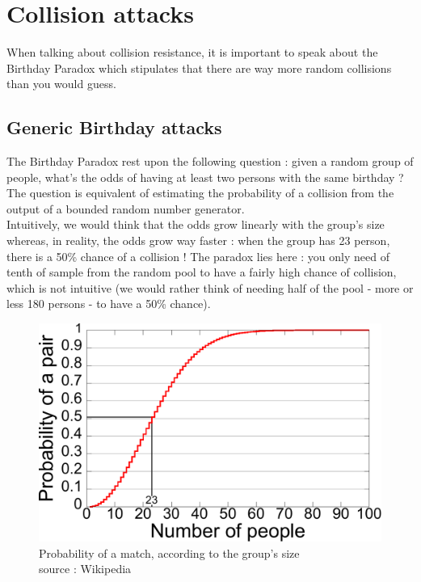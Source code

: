 \section{Collision attacks}

When talking about collision resistance, it is important to speak about the Birthday Paradox which stipulates that there are way more random collisions than you would guess.

\subsection{Generic Birthday attacks}

The Birthday Paradox rest upon the following question : given a random group of people, what's the odds of having at least two persons with the same birthday ? The question is equivalent of estimating the probability of a collision from the output of a bounded random number generator.\\

Intuitively, we would think that the odds grow linearly with the group's size whereas, in reality, the odds grow way faster : when the group has 23 person, there is a 50\% chance of a collision ! The paradox lies here : you only need of tenth of sample from the random pool to have a fairly high chance of collision, which is not intuitive (we would rather think of needing half of the pool - more or less 180 persons -  to have a 50\% chance).

\begin{figure}[ht!]
    \centering
   	\includegraphics[width=\textwidth]{images/Birthday_Paradox.pdf}
	\caption{Probability of a match, according to the group's size \\ source : Wikipedia}
	\label{fig:BirthdayParadox}
\end{figure}

